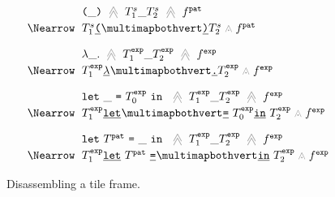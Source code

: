 \begin{figure}
  \newcommand{\vstretch}{\vspace{0.3cm}}
  \[
    \arraycolsep=3pt
    \def\arraystretch{1.2}
    \begin{array}{rl}
      & \tframelit{
        \sparen{\_}
      }{
        \tframelit{\tiles^s_1\_\tiles^s_2}{\tfrelem^{\pat}}
      } \\
      \tframedu
      & \zipper{
        \pointing{\tiles^s_1\shardlit{\texttt{(}}~}{~\shardlit{\texttt{)}}\tiles^s_2}
      }{
        \tfrelem^{\pat}
      } \vstretch \\

      & \tframelit{
        \slam{\_}{}
      }{
        \tframelit{\tiles^{\expr}_1\_\tiles^{\expr}_2}{\tfrelem^{\expr}}
      } \\
      \tframedu
      & \zipper{
        \pointing{\tiles^{\expr}_1\shardlit{\lambda}~}{~\shardlit{\texttt{.}}\tiles^{\expr}_2}
      }{
        \tfrelem^{\expr}
      } \vstretch \\

      & \tframelit{
        \slet{\_}{\tiles^{\expr}_0}{}
      }{
        \tframelit{\tiles^{\expr}_1\_\tiles^{\expr}_2}{\tfrelem^{\expr}}
      } \\
      \tframedu
      & \zipper{
        \pointing{
          \tiles^{\expr}_1\shardlit{\texttt{let}}~
        }{
          ~\shardlit{\texttt{=}}~\tiles^{\expr}_0\shardlit{\texttt{in}}~\tiles^{\expr}_2
        }
      }{
        \tfrelem^{\expr}
      } \vstretch \\

      & \tframelit{
        \slet{\tiles^{\pat}}{\_}{}
      }{
        \tframelit{\tiles^{\expr}_1\_\tiles^{\expr}_2}{\tfrelem^{\expr}}
      } \\
      \tframedu
      & \zipper{
        \pointing{
          \tiles^{\expr}_1\shardlit{\texttt{let}}~\tiles^{\pat}~\shardlit{\texttt{=}}~
        }{
          ~\shardlit{\texttt{in}}~\tiles^{\expr}_2
        }
      }{
        \tfrelem^{\expr}
      }
  \end{array}\]
  \caption{
    Disassembling a tile frame. 
  }
  \label{fig:disassemble-tile}
\end{figure}